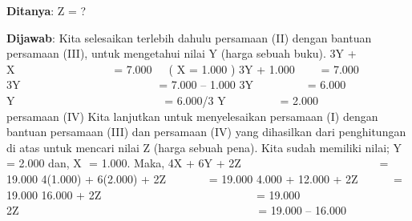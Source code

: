 \documentclass[11pt,fleqn]{book} %
\begin{document}
\begin{myEnumerate}
\begin{itemize}
		\vspace{\baselineskip}
		\textbf{Ditanya}:\vspace{\baselineskip}
		Z = ? \par
		\vspace{12pt}
		\noindent 
		\textbf{Dijawab}:\vspace{\baselineskip}
		Kita selesaikan terlebih dahulu persamaan (II) dengan bantuan persamaan (III), untuk mengetahui nilai Y (harga sebuah buku).\vspace{\baselineskip}
		3Y + X~~~~~~~~~~~~~~~~~ = 7.000  $  $  $  $~ ( X = 1.000 )\vspace{\baselineskip}
		3Y + 1.000  $  $  $  $  $  $  $  $  $  $ $  $ = 7.000\vspace{\baselineskip}
		3Y~~~~~~~~~~~~~~~~~~~~~~~~ = 7.000 – 1.000\vspace{\baselineskip}
		3Y  $  $  $  $  $  $  $  $  $  $  $  $  $  $  $  $  $  $  $  $  $  $ $  $~ = 6.000\vspace{\baselineskip}
		Y~~~~~~~~~~~~~~~~~~~~~~~~~~ = 6.000/3\vspace{\baselineskip}
		Y  $  $  $  $  $  $  $  $  $  $  $  $  $  $  $  $  $  $  $  $  $  $  $  $~ = 2.000~~~~~~~~ persamaan (IV)\vspace{\baselineskip}
		\vspace{\baselineskip}
		Kita lanjutkan untuk menyelesaikan persamaan (I) dengan bantuan persamaan (III) dan persamaan (IV) yang dihasilkan dari penghitungan di atas untuk mencari nilai Z (harga sebuah pena).\vspace{\baselineskip}
		Kita sudah memiliki nilai;\vspace{\baselineskip}
		Y  $  $  $  $= 2.000 dan,\vspace{\baselineskip}
		X  $  $  $  $= 1.000.\vspace{\baselineskip}
		\vspace{\baselineskip}
		Maka,\vspace{\baselineskip}
		4X + 6Y + 2Z~~~~~~~~~~~~~~~~~~~~~~~~ = 19.000\vspace{\baselineskip}
		4(1.000) + 6(2.000) + 2Z~~~~~~~ = 19.000\vspace{\baselineskip}
		4.000 + 12.000 + 2Z  $  $  $  $  $  $  $  $  $  $  $  $ $  $~ = 19.000\vspace{\baselineskip}
		16.000 + 2Z~~~~~~~~~~~~~~~~~~~~~~~~~~~ = 19.000\vspace{\baselineskip}
		2Z~~~~~~~~~~~~~~~~~~~~~~~~~~~~~~~~~~~~~~~~~~ = 19.000 – 16.000\vspace{\baselineskip}

\end{itemize}
\end{myEnumerate}
\end{document}
